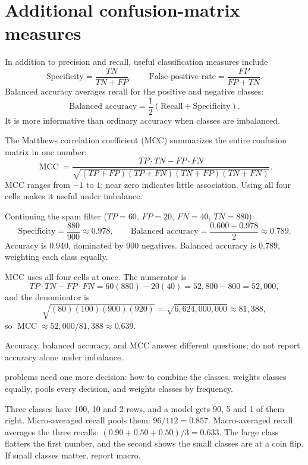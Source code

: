 \section{Additional confusion-matrix measures}

In addition to precision and recall, useful classification measures include
\[
  \text{Specificity}=\frac{TN}{TN+FP},
  \qquad
  \text{False-positive rate}=\frac{FP}{FP+TN}.
\]
Balanced accuracy averages recall for the positive and negative classes:
\[
  \text{Balanced accuracy}
  =\frac{1}{2}
  (\text{Recall}+\text{Specificity}).
\]
It is more informative than ordinary accuracy when classes are imbalanced.

The Matthews correlation coefficient (MCC) summarizes the entire confusion matrix in one number:
\[
  \operatorname{MCC}
  =\frac{TP\cdot TN-FP\cdot FN}
  {\sqrt{(TP+FP)(TP+FN)(TN+FP)(TN+FN)}}.
\]
MCC ranges from $-1$ to $1$; near zero indicates little association. Using all four cells makes it useful under imbalance.

\begin{workedexample}
Continuing the spam filter ($TP=60$, $FP=20$, $FN=40$, $TN=880$):
\[
  \text{Specificity}=\frac{880}{900}\approx 0.978,
  \qquad
  \text{Balanced accuracy}=\frac{0.600+0.978}{2}\approx 0.789.
\]
Accuracy is $0.940$, dominated by 900 negatives. Balanced accuracy is $0.789$, weighting each class equally.

MCC uses all four cells at once. The numerator is
\[
  TP\cdot TN-FP\cdot FN=60(880)-20(40)=52{,}800-800=52{,}000,
\]
and the denominator is
\[
  \sqrt{(80)(100)(900)(920)}=\sqrt{6{,}624{,}000{,}000}\approx 81{,}388,
\]
so $\operatorname{MCC}\approx 52{,}000/81{,}388\approx 0.639$.

Accuracy, balanced accuracy, and MCC answer different questions; do not report accuracy alone under imbalance.
\end{workedexample}

 problems need one more decision: how to combine the classes.  weights classes equally,  pools every decision, and  weights classes by frequency.

\begin{workedexample}
Three classes have 100, 10 and 2 rows, and a model gets 90, 5 and 1 of them right. Micro-averaged recall pools them: $96/112=0.857$. Macro-averaged recall averages the three recalls: $(0.90+0.50+0.50)/3=0.633$. The large class flatters the first number, and the second shows the small classes are at a coin flip. If small classes matter, report macro.
\end{workedexample}

